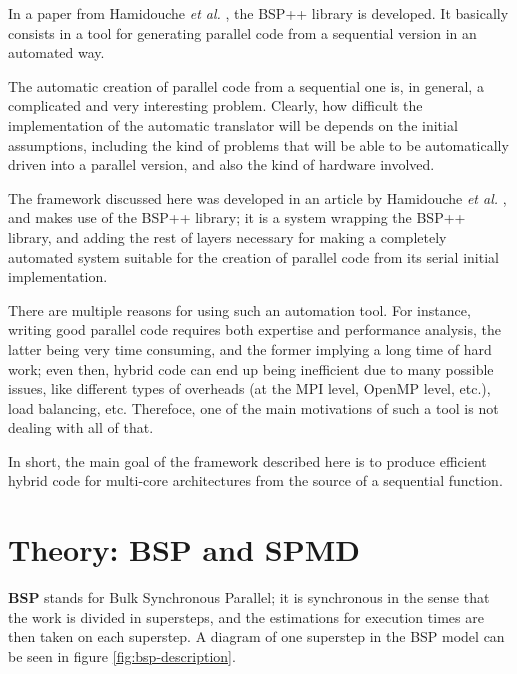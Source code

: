\documentclass[paper=a4, fontsize=11pt]{scrartcl} %
\numberwithin{equation}{section} %
\numberwithin{figure}{section} %
\numberwithin{table}{section} %
\begin{document}
In a paper from Hamidouche \textit{et al.} \cite{hamidouche2}, the BSP++ library is developed. It basically consists in a tool for generating parallel code from a sequential version in an automated way.

The automatic creation of parallel code from a sequential one is, in general, a complicated and very interesting problem. Clearly, how difficult the implementation of the automatic translator will be depends on the initial assumptions, including the kind of problems that will be able to be automatically driven into a parallel version, and also the kind of hardware involved.

The framework discussed here was developed in an article by Hamidouche \textit{et al.} \cite{hamidouche}, and makes use of the BSP++ library; it is a system wrapping the BSP++ library, and adding the rest of layers necessary for making a completely automated system suitable for the creation of parallel code from its serial initial implementation.

There are multiple reasons for using such an automation tool. For instance, writing good parallel code requires both expertise and performance analysis, the latter being very time consuming, and the former implying a long time of hard work; even then, hybrid code can end up being inefficient due to many possible issues, like different types of overheads (at the MPI level, OpenMP level, etc.), load balancing, etc. Therefoce, one of the main motivations of such a tool is not dealing with all of that.

In short, the main goal of the framework described here is to produce efficient hybrid code for multi-core architectures from the source of a sequential function.






\section{Theory: BSP and SPMD}

\textbf{BSP} stands for Bulk Synchronous Parallel; it is synchronous in the sense that the work is divided in supersteps, and the estimations for execution times are then taken on each superstep. A diagram of one superstep in the BSP model can be seen in figure \ref{fig:bsp-description}.
\end{document}
